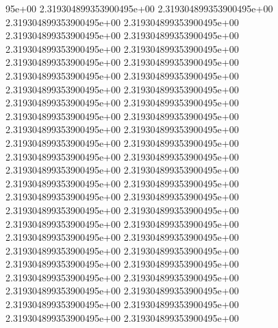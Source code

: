 95e+00	2.319304899353900495e+00	2.319304899353900495e+00	2.319304899353900495e+00	2.319304899353900495e+00	2.319304899353900495e+00	2.319304899353900495e+00	2.319304899353900495e+00	2.319304899353900495e+00	2.319304899353900495e+00	2.319304899353900495e+00	2.319304899353900495e+00	2.319304899353900495e+00	2.319304899353900495e+00	2.319304899353900495e+00	2.319304899353900495e+00	2.319304899353900495e+00	2.319304899353900495e+00	2.319304899353900495e+00	2.319304899353900495e+00	2.319304899353900495e+00	2.319304899353900495e+00	2.319304899353900495e+00	2.319304899353900495e+00	2.319304899353900495e+00	2.319304899353900495e+00	2.319304899353900495e+00	2.319304899353900495e+00	2.319304899353900495e+00	2.319304899353900495e+00	2.319304899353900495e+00	2.319304899353900495e+00	2.319304899353900495e+00	2.319304899353900495e+00	2.319304899353900495e+00	2.319304899353900495e+00	2.319304899353900495e+00	2.319304899353900495e+00	2.319304899353900495e+00	2.319304899353900495e+00	2.319304899353900495e+00	2.319304899353900495e+00	2.319304899353900495e+00	2.319304899353900495e+00	2.319304899353900495e+00	2.319304899353900495e+00	2.319304899353900495e+00	2.319304899353900495e+00	2.319304899353900495e+00
